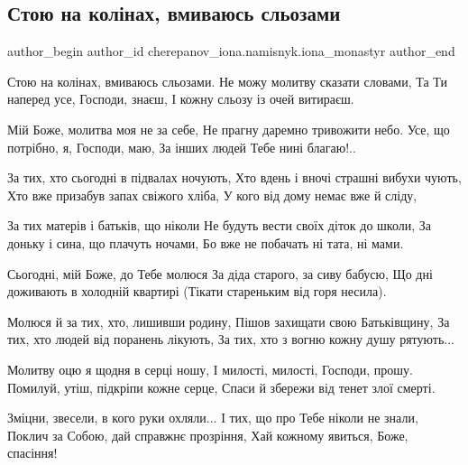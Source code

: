  
 
 
 
 

\subsection{Стою на колінах, вмиваюсь сльозами}
\label{sec:26_09_2022.fb.cherepanov_iona.namisnyk.iona_monastyr.1.stoyu_na_kol_nakh__v}

\ifcmt
 author_begin
   author_id cherepanov_iona.namisnyk.iona_monastyr
 author_end
\fi

\obeycr
\noindent
Стою на колінах, вмиваюсь сльозами.
Не можу молитву сказати словами,
Та Ти наперед усе, Господи, знаєш,
І кожну сльозу із очей витираєш. 
\restorecr

\obeycr
\noindent
Мій Боже, молитва моя не за себе,
Не прагну даремно тривожити небо.
Усе, що потрібно, я, Господи, маю,
За інших людей Тебе нині благаю!..
\restorecr

\obeycr
\noindent
За тих, хто сьогодні в підвалах ночують,
Хто вдень і вночі страшні вибухи чують,
Хто вже призабув запах свіжого хліба,
У кого від дому немає вже й сліду,
\restorecr

\obeycr
\noindent
За тих матерів і батьків, що ніколи
Не будуть вести своїх діток до школи,
За доньку і сина, що плачуть ночами,
Бо вже не побачать ні тата, ні мами.
\restorecr

\obeycr
\noindent
Сьогодні, мій Боже, до Тебе молюся
За діда старого, за сиву бабусю,
Що дні доживають в холодній квартирі
(Тікати стареньким від горя несила).
\restorecr

\obeycr
\noindent
Молюся й за тих, хто, лишивши родину,
Пішов захищати свою Батьківщину,
За тих, хто людей від поранень лікують,
За тих, хто з вогню кожну душу рятують...
\restorecr

\obeycr
\noindent
Молитву оцю я щодня в серці ношу,
І милості, милості, Господи, прошу.
Помилуй, утіш, підкріпи кожне серце,
Спаси й збережи від тенет злої смерті.
\restorecr

\obeycr
\noindent
Зміцни, звесели, в кого руки охляли...
І тих, що про Тебе ніколи не знали,
Поклич за Собою, дай справжнє прозріння,
Хай кожному явиться, Боже, спасіння!
\restorecr
